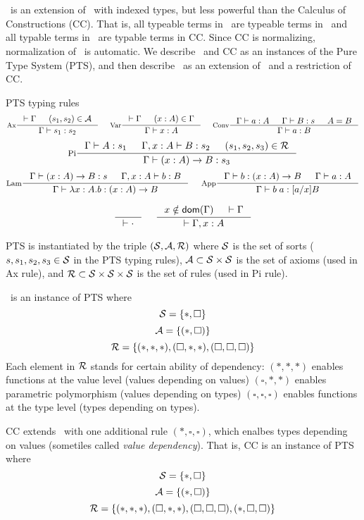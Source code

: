 \section{\Fi}
\Fi\ is an extension of \Fw\ with indexed types, but less powerful than
the Calculus of Constructions (CC). That is, all typeable terms in \Fi\ are
typeable terms in \Fi\ and all typable terms in \Fi\ are typable terms in CC.
Since CC is normalizing, normalization of \Fi\ is automatic.
We describe \Fw\ and CC as an instances of the Pure Type System (PTS),
and then describe \Fi\ as an extension of \Fw\ and a restriction of CC.

PTS typing rules
\[
 \inference[Ax]{|-\Gamma & (s_1,s_2)\in\calA}{\Gamma |- s_1 : s_2}
 ~~~~
 \inference[Var]{|-\Gamma & (x:A)\in\Gamma}{\Gamma |- x:A} 
 ~~~~
 \inference[Conv]{\Gamma |- a:A & \Gamma |- B:s & A=B}{\Gamma |- a:B}
\]
\[
 \inference[Pi]{\Gamma |- A:s_1 & \Gamma,x:A |- B:s_2 & (s_1,s_2,s_3)\in\calR}
               {\Gamma |- (x:A)\to B : s_3}
\]
\[
 \inference[Lam]{\Gamma |- (x:A)\to B : s & \Gamma,x:A |- b:B}
                {\Gamma |- \lambda x:A.b : (x:A)\to B}
 ~~~~
 \inference[App]{\Gamma |- b:(x:A)\to B & \Gamma |- a:A}{\Gamma |- b\;a:[a/x]B}
\]


\[
 \inference{}{|-\cdot}
 ~~~~
 \inference{x\notin\dom(\Gamma) & |-\Gamma}{|-\Gamma,x:A}
\]

PTS is instantiated by the triple $(\mathcal{S},\mathcal{A},\mathcal{R})$ where
$\mathcal{S}$ is the set of sorts ($s,s_1,s_2,s_3\in\mathcal{S}$ in the PTS typing rules),
$\mathcal{A}\subset\mathcal{S}\times\mathcal{S}$ is the set of axioms (used in Ax rule), and
$\mathcal{R}\subset\mathcal{S}\times\mathcal{S}\times\mathcal{S}$ is the set of rules (used in Pi rule).

\Fw\ is an instance of PTS where
\[\mathcal{S}=\{*,\square\}\]
\[\mathcal{A}=\{(*,\square)\}\]
\[\mathcal{R}=\{(*,*,*),(\square,*,*),(\square,\square,\square)\}\]
Each element in $\mathcal{R}$ stands for certain ability of dependency:
$(*,*,*)$ enables functions at the value level
(values depending on values)
$(\square,*,*)$ enables parametric polymorphism
(values depending on types)
$(\square,\square,\square)$ enables functions at the type level
(types depending on types).

CC extends \Fw\ with one additional rule
$(*,\square,\square)$, which enalbes types depending on values
(sometiles called \emph{value dependency}).
That is, CC is an instance of PTS where
\[\mathcal{S}=\{*,\square\}\]
\[\mathcal{A}=\{(*,\square)\}\]
\[\mathcal{R}=\{(*,*,*),(\square,*,*),(\square,\square,\square)
         ,(*,\square,\square)\}\]

